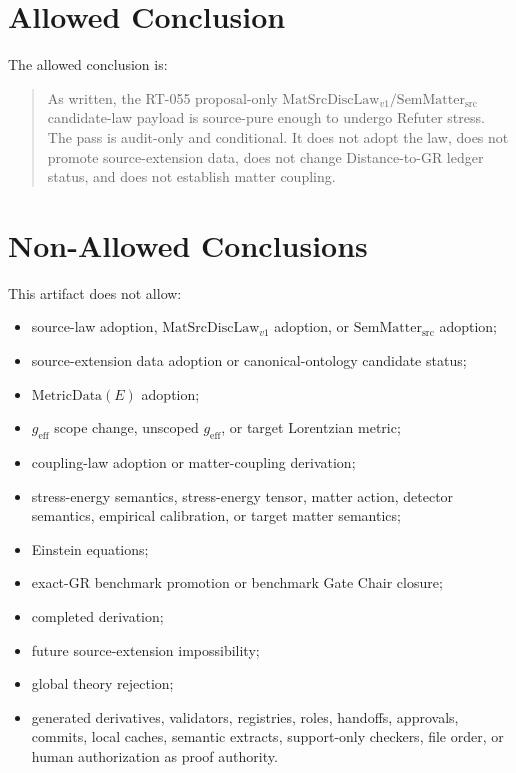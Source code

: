 \documentclass[11pt]{article}
\newcommand{\MetricData}{\mathrm{MetricData}}
\newcommand{\geff}{g_{\mathrm{eff}}}
\newcommand{\MatSrcDiscLaw}{\mathrm{MatSrcDiscLaw}_{v1}}
\newcommand{\SemMatterSrc}{\mathrm{SemMatter}_{\mathrm{src}}}
\begin{document}
\section{Allowed Conclusion}

The allowed conclusion is:

\begin{quote}
As written, the RT-055 proposal-only \(\MatSrcDiscLaw / \SemMatterSrc\)
candidate-law payload is source-pure enough to undergo Refuter stress.  The
pass is audit-only and conditional.  It does not adopt the law, does not
promote source-extension data, does not change Distance-to-GR ledger status,
and does not establish matter coupling.
\end{quote}

\section{Non-Allowed Conclusions}

This artifact does not allow:

\begin{itemize}[leftmargin=*]
\item source-law adoption, \(\MatSrcDiscLaw\) adoption, or
  \(\SemMatterSrc\) adoption;
\item source-extension data adoption or canonical-ontology candidate status;
\item \(\MetricData(E)\) adoption;
\item \(\geff\) scope change, unscoped \(\geff\), or target Lorentzian metric;
\item coupling-law adoption or matter-coupling derivation;
\item stress-energy semantics, stress-energy tensor, matter action, detector
  semantics, empirical calibration, or target matter semantics;
\item Einstein equations;
\item exact-GR benchmark promotion or benchmark Gate Chair closure;
\item completed derivation;
\item future source-extension impossibility;
\item global theory rejection;
\item generated derivatives, validators, registries, roles, handoffs,
  approvals, commits, local caches, semantic extracts, support-only checkers,
  file order, or human authorization as proof authority.
\end{itemize}
\end{document}
